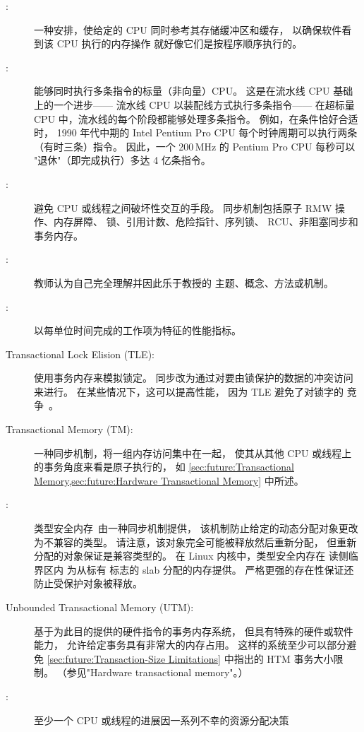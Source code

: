 \begin{description}
\item[:]
	一种安排，使给定的 CPU 同时参考其存储缓冲区和缓存，
	以确保软件看到该 CPU 执行的内存操作
	就好像它们是按程序顺序执行的。
\item[:]
	能够同时执行多条指令的标量（非向量）CPU。
	这是在流水线 CPU 基础上的一个进步——
	流水线 CPU 以装配线方式执行多条指令——
	在超标量 CPU 中，流水线的每个阶段都能够处理多条指令。
	例如，在条件恰好合适时，
	1990 年代中期的 Intel Pentium Pro CPU
	每个时钟周期可以执行两条（有时三条）指令。
	因此，一个 200\,MHz 的 Pentium Pro CPU 每秒可以
	"退休"（即完成执行）多达 4 亿条指令。
\item[:]
	避免 CPU 或线程之间破坏性交互的手段。
	同步机制包括原子 RMW 操作、内存屏障、
	锁、引用计数、危险指针、序列锁、
	RCU、非阻塞同步和事务内存。
\item[:]
	教师认为自己完全理解并因此乐于教授的
	主题、概念、方法或机制。
\item[:]
	以每单位时间完成的工作项为特征的性能指标。
\item[Transactional Lock Elision (TLE):]
	使用事务内存来模拟锁定。
	同步改为通过对要由锁保护的数据的冲突访问来进行。
	在某些情况下，这可以提高性能，
	因为 TLE 避免了对锁字的
	竞争~\cite{MartinPohlack2011HTM2TLE,Kleen:2014:SEL:2566590.2576793,PascalFelber2016rwlockElision,SeongJaePark2020HTMRCUlock}。
\item[Transactional Memory (TM):]
	一种同步机制，将一组内存访问集中在一起，
	使其从其他 CPU 或线程上的事务角度来看是原子执行的，
	如 \cref{sec:future:Transactional Memory,sec:future:Hardware Transactional Memory}
	中所述。
\item[:]
	类型安全内存~\cite{Cheriton96a}由一种同步机制提供，
	该机制防止给定的动态分配对象更改为不兼容的类型。
	请注意，该对象完全可能被释放然后重新分配，
	但重新分配的对象保证是兼容类型的。
	在 Linux 内核中，类型安全内存在  读侧临界区内
	为从标有  标志的 slab 分配的内存提供。
	严格更强的存在性保证还防止受保护对象被释放。
\item[Unbounded Transactional Memory (UTM):]
	基于为此目的提供的硬件指令的事务内存系统，
	但具有特殊的硬件或软件能力，
	允许给定事务具有非常大的内存占用。
	这样的系统至少可以部分避免
	\cref{sec:future:Transaction-Size Limitations}
	中指出的 HTM 事务大小限制。
	（参见"Hardware transactional memory"。）
\item[:]
	至少一个 CPU 或线程的进展因一系列不幸的资源分配决策

\end{description}
